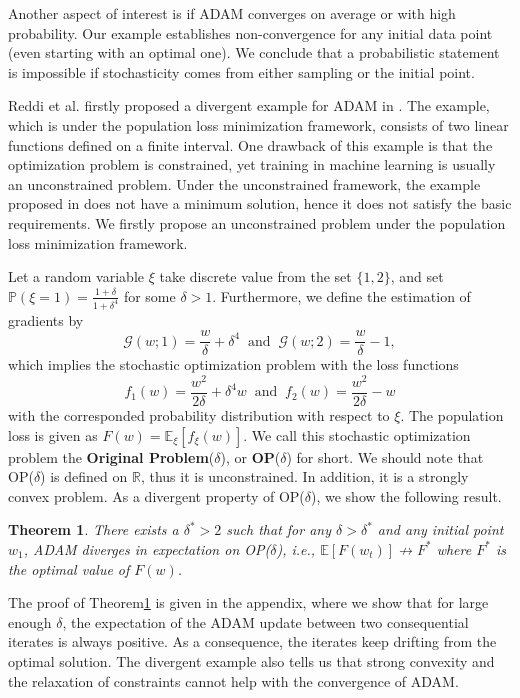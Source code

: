 \documentclass[twoside]{article}
\def\RR{\mathbb{R}}
\def\EE{\mathbb{E}}
\def\PP{\mathbb{P}}
\def\GG{\mathcal{G}}
\newtheorem{theorem}{Theorem}
\begin{document}
Another aspect of interest is if ADAM converges on average or with high probability. Our example establishes non-convergence for any initial data point (even starting with an optimal one). We conclude that a probabilistic statement is impossible if stochasticity comes from either sampling or the initial point.

Reddi et al. firstly proposed a divergent example for ADAM in \cite{reddi2019convergence}. The example, which is under the population loss minimization framework, consists of two linear functions defined on a finite interval. One drawback of this example is that the optimization problem is constrained, yet training in machine learning is usually an unconstrained problem. Under the unconstrained framework, the example proposed in \cite{reddi2019convergence} does not have a minimum solution, hence it does not satisfy the basic requirements. We firstly propose an unconstrained problem under the population loss minimization framework.

Let a random variable $\xi$ take discrete value from the set $\{1,2\}$, and set $\PP(\xi = 1) = \frac{1+\delta}{1+\delta^4}$ for some $\delta>1$. Furthermore, we define the estimation of gradients by
\begin{equation}
    \GG(w;1)= \frac{w}{\delta} + \delta^4 \;\;\text{and}\;\;\GG(w;2)= \frac{w}{\delta} - 1,\nonumber
\end{equation}
which implies the stochastic optimization problem with the loss functions
\begin{equation}
    f_1(w) = \frac{w^2}{2\delta} + \delta^4 w\;\;\text{and}\;\;    f_2(w) = \frac{w^2}{2\delta} - w\nonumber
\end{equation}
with the corresponded probability distribution with respect to $\xi$. The population loss is given as $F(w) = \EE_{\xi}\left[ f_\xi(w)\right]$.
We call this stochastic optimization problem the \textbf{Original Problem}($\delta$), or \textbf{OP}($\delta$) for short. We should note that OP($\delta$) is defined on $\RR$, thus it is unconstrained. In addition, it is a strongly convex problem. As a divergent property of OP($\delta$), we show the following result.
\begin{theorem}
\label{thm:DivOP}
There exists a $\delta^*>2$ such that for any $\delta>\delta^*$ and any initial point $w_1$, ADAM diverges in expectation on OP($\delta$), i.e., $\EE[F(w_t)]\not \to F^*$ where $F^*$ is the optimal value of $F(w)$.
\end{theorem}
The proof of Theorem\ref{thm:DivOP} is given in the appendix, where we show that for large enough $\delta$, the expectation of the ADAM update between two consequential iterates is always positive. As a  consequence, the iterates keep drifting from the optimal solution. The divergent example also tells us that strong convexity and the relaxation of constraints cannot help with the convergence of ADAM.
\end{document}
